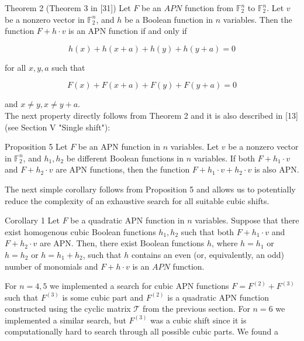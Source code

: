 \documentclass[10pt]{article}
\begin{document}
Theorem 2 (Theorem 3 in [31]) Let $F$ be an $A P N$ function from $\mathbb{F}_{2}^{n}$ to $\mathbb{F}_{2}^{n}$. Let $v$ be a nonzero vector in $\mathbb{F}_{2}^{n}$, and $h$ be a Boolean function in $n$ variables. Then the function $F+h \cdot v$ is an APN function if and only if

$$
h(x)+h(x+a)+h(y)+h(y+a)=0
$$

for all $x, y, a$ such that

$$
F(x)+F(x+a)+F(y)+F(y+a)=0
$$

and $x \neq y, x \neq y+a$.\\[0pt]
The next property directly follows from Theorem 2 and it is also described in [13] (see Section V "Single shift"):

Proposition 5 Let $F$ be an APN function in $n$ variables. Let $v$ be a nonzero vector in $\mathbb{F}_{2}^{n}$, and $h_{1}, h_{2}$ be different Boolean functions in $n$ variables. If both $F+h_{1} \cdot v$ and $F+h_{2} \cdot v$ are APN functions, then the function $F+h_{1} \cdot v+h_{2} \cdot v$ is also APN.

The next simple corollary follows from Proposition 5 and allows us to potentially reduce the complexity of an exhaustive search for all suitable cubic shifts.

Corollary 1 Let $F$ be a quadratic APN function in $n$ variables. Suppose that there exist homogenous cubic Boolean functions $h_{1}, h_{2}$ such that both $F+h_{1} \cdot v$ and $F+h_{2} \cdot v$ are APN. Then, there exist Boolean functions $h$, where $h=h_{1}$ or $h=h_{2}$ or $h=h_{1}+h_{2}$, such that $h$ contains an even (or, equivalently, an odd) number of monomials and $F+h \cdot v$ is an $A P N$ function.

For $n=4,5$ we implemented a search for cubic APN functions $F= F^{(2)}+F^{(3)}$ such that $F^{(3)}$ is some cubic part and $F^{(2)}$ is a quadratic APN function constructed using the cyclic matrix $\mathcal{T}$ from the previous section. For $n=6$ we implemented a similar search, but $F^{(3)}$ was a cubic shift since it is computationally hard to search through all possible cubic parts. We found a
\end{document}
